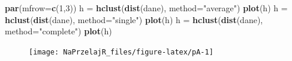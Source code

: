 \documentclass[polish,]{book}
\newenvironment{Shaded}{\begin{snugshade}}{\end{snugshade}}
\newcommand{\DataTypeTok}[1]{\textcolor[rgb]{0.13,0.29,0.53}{#1}}
\newcommand{\DecValTok}[1]{\textcolor[rgb]{0.00,0.00,0.81}{#1}}
\newcommand{\KeywordTok}[1]{\textcolor[rgb]{0.13,0.29,0.53}{\textbf{#1}}}
\newcommand{\NormalTok}[1]{#1}
\newcommand{\StringTok}[1]{\textcolor[rgb]{0.31,0.60,0.02}{#1}}
\begin{document}
\begin{Shaded}
\begin{Highlighting}[]
\KeywordTok{par}\NormalTok{(}\DataTypeTok{mfrow=}\KeywordTok{c}\NormalTok{(}\DecValTok{1}\NormalTok{,}\DecValTok{3}\NormalTok{))}
\NormalTok{h =}\StringTok{ }\KeywordTok{hclust}\NormalTok{(}\KeywordTok{dist}\NormalTok{(dane), }\DataTypeTok{method=}\StringTok{"average"}\NormalTok{)}
\KeywordTok{plot}\NormalTok{(h)}
\NormalTok{h =}\StringTok{ }\KeywordTok{hclust}\NormalTok{(}\KeywordTok{dist}\NormalTok{(dane), }\DataTypeTok{method=}\StringTok{"single"}\NormalTok{)}
\KeywordTok{plot}\NormalTok{(h)}
\NormalTok{h =}\StringTok{ }\KeywordTok{hclust}\NormalTok{(}\KeywordTok{dist}\NormalTok{(dane), }\DataTypeTok{method=}\StringTok{"complete"}\NormalTok{)}
\KeywordTok{plot}\NormalTok{(h)}
\end{Highlighting}
\end{Shaded}

\begin{figure}[h]

{\centering \texttt{[image: NaPrzelajR\_files/figure-latex/pA-1]} 

}

\end{figure}
\end{document}
